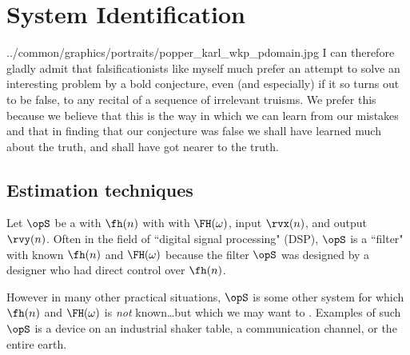 \chapter{System Identification}
  {../common/graphics/portraits/popper_karl_wkp_pdomain.jpg}
  {%
  I can therefore gladly admit that falsificationists like myself much
  prefer an attempt to solve an interesting problem by a bold conjecture,
  even (and especially) if it so turns out to be false,
  to any recital of a sequence of irrelevant truisms.
  We prefer this because we believe that this is the way in which we can
  learn from our mistakes and that in finding that our conjecture was false
  we shall have learned much about the truth,
  and shall have got nearer to the truth.
  }

\section{Estimation techniques}
Let $\opS$ be a  with  $\fh(n)$ with
with  $\FH(\omega)$,
input $\rvx(n)$, and output $\rvy(n)$.
Often in the field of ``digital signal processing" (DSP), $\opS$ is a ``filter"
with known $\fh(n)$ and $\FH(\omega)$ because the filter $\opS$ was
designed by a designer who had direct control over $\fh(n)$.

However in many other practical situations, $\opS$ is some other system
for which $\fh(n)$ and $\FH(\omega)$ is \emph{not} known\ldots but which we may
want to . Examples of such $\opS$ is a
device on an industrial shaker table, a communication channel, or the entire earth.


